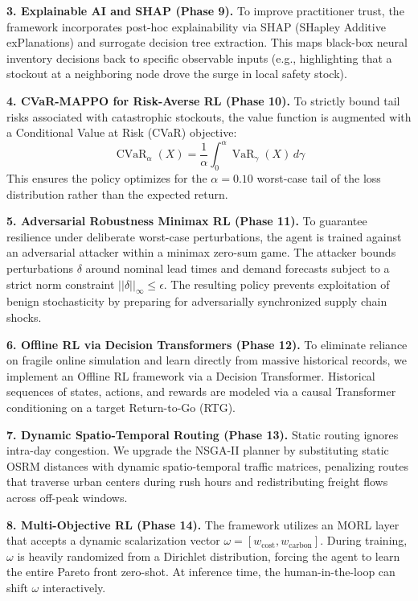 \documentclass[review,preprint,authoryear,12pt]{elsarticle}
\begin{document}
\textbf{3. Explainable AI and SHAP (Phase 9).} To improve practitioner trust, the framework incorporates post-hoc explainability via SHAP (SHapley Additive exPlanations) and surrogate decision tree extraction. This maps black-box neural inventory decisions back to specific observable inputs (e.g., highlighting that a stockout at a neighboring node drove the surge in local safety stock).

\textbf{4. CVaR-MAPPO for Risk-Averse RL (Phase 10).} To strictly bound tail risks associated with catastrophic stockouts, the value function is augmented with a Conditional Value at Risk (CVaR) objective:
\begin{equation}
\operatorname{CVaR}_\alpha(X) = \frac{1}{\alpha} \int_0^\alpha \operatorname{VaR}_\gamma(X) \, d\gamma
\end{equation}
This ensures the policy optimizes for the $\alpha=0.10$ worst-case tail of the loss distribution rather than the expected return.

\textbf{5. Adversarial Robustness Minimax RL (Phase 11).} To guarantee resilience under deliberate worst-case perturbations, the agent is trained against an adversarial attacker within a minimax zero-sum game. The attacker bounds perturbations $\delta$ around nominal lead times and demand forecasts subject to a strict norm constraint $||\delta||_\infty \leq \epsilon$. The resulting policy prevents exploitation of benign stochasticity by preparing for adversarially synchronized supply chain shocks.

\textbf{6. Offline RL via Decision Transformers (Phase 12).} To eliminate reliance on fragile online simulation and learn directly from massive historical records, we implement an Offline RL framework via a Decision Transformer. Historical sequences of states, actions, and rewards are modeled via a causal Transformer conditioning on a target Return-to-Go (RTG).

\textbf{7. Dynamic Spatio-Temporal Routing (Phase 13).} Static routing ignores intra-day congestion. We upgrade the NSGA-II planner by substituting static OSRM distances with dynamic spatio-temporal traffic matrices, penalizing routes that traverse urban centers during rush hours and redistributing freight flows across off-peak windows.

\textbf{8. Multi-Objective RL (Phase 14).} The framework utilizes an MORL layer that accepts a dynamic scalarization vector $\omega = [w_{\text{cost}}, w_{\text{carbon}}]$. During training, $\omega$ is heavily randomized from a Dirichlet distribution, forcing the agent to learn the entire Pareto front zero-shot. At inference time, the human-in-the-loop can shift $\omega$ interactively.
\end{document}
